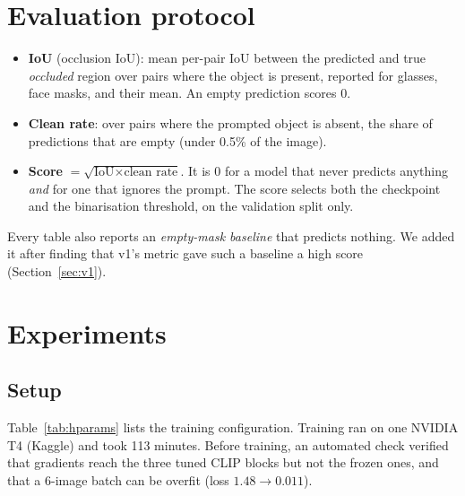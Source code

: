 \documentclass[11pt,a4paper]{article}
\begin{document}
\section{Evaluation protocol}
\label{sec:eval}

\begin{itemize}
  \item \textbf{IoU} (occlusion IoU): mean per-pair IoU between the predicted and true \emph{occluded}
  region over pairs where the object is present, reported for glasses, face masks, and their mean. An
  empty prediction scores 0.
  \item \textbf{Clean rate}: over pairs where the prompted object is absent, the share of predictions
  that are empty (under 0.5\% of the image).
  \item \textbf{Score} $=\sqrt{\text{IoU}\times\text{clean rate}}$. It is 0 for a model that never predicts
  anything \emph{and} for one that ignores the prompt. The score selects both the checkpoint and the
  binarisation threshold, on the validation split only.
\end{itemize}
Every table also reports an \emph{empty-mask baseline} that predicts nothing. We added it after
finding that v1's metric gave such a baseline a high score (Section~\ref{sec:v1}).

\section{Experiments}
\label{sec:results}

\subsection{Setup}
Table~\ref{tab:hparams} lists the training configuration. Training ran on one NVIDIA T4 (Kaggle) and
took 113 minutes. Before training, an automated check verified that gradients reach the three tuned
CLIP blocks but not the frozen ones, and that a 6-image batch can be overfit (loss $1.48\to0.011$).
\end{document}
